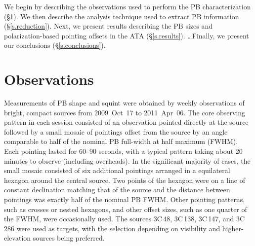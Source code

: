 \documentclass[preprint]{aastex}
\begin{document}
We begin by describing the observations used to perform the PB
characterization (\S\ref{s.observations}). We then describe the
analysis technique used to extract PB information
(\S\ref{s.reduction}). Next, we present results describing the PB
sizes and polarization-based pointing offsets in the ATA
(\S\ref{s.results}). \ldots Finally, we present our conclusions
(\S\ref{s.conclusions}).


\section{Observations}\label{s.observations}

Measurements of PB shape and squint were obtained by
weekly observations of bright, compact sources from 2009~Oct~17 to
2011~Apr~06. The core observing pattern in each session consisted of
an observation pointed directly at the source followed by a small
mosaic of pointings offset from the source by an angle comparable to
half of the nominal PB full-width at half maximum (FWHM). Each
pointing lasted for 60--90 seconds, with a typical pattern taking
about 20 minutes to observe (including overheads). In the significant
majority of cases, the small mosaic consisted of six additional
pointings arranged in a equilateral hexagon around the central
source. Two points of the hexagon were on a line of constant
declination matching that of the source and the distance between
pointings was exactly half of the nominal PB FWHM. Other pointing
patterns, such as crosses or nested hexagons, and other offset sizes,
such as one quarter of the FWHM, were occasionally used.  The sources
3C\,48, 3C\,138, 3C\,147, and 3C\,286 were used as targets, with the
selection depending on visibility and higher-elevation sources being
preferred.
\end{document}

